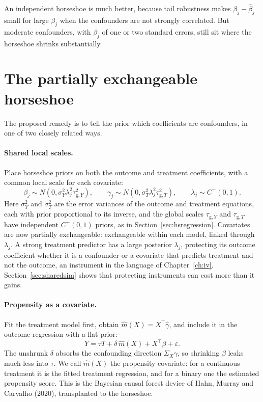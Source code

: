 An independent horseshoe is much better, because tail robustness makes $\beta_j - \hat\beta_j$ small for large $\beta_j$ when the confounders are not strongly correlated. But moderate confounders, with $\beta_j$ of one or two standard errors, still sit where the horseshoe shrinks substantially.

\section{The partially exchangeable horseshoe}

The proposed remedy is to tell the prior which coefficients are confounders, in one of two closely related ways.

\paragraph{Shared local scales.} Place horseshoe priors on both the outcome and treatment coefficients, with a common local scale for each covariate:
\begin{equation}
\beta_j \sim N(0, \sigma_Y^2\lambda_j^2\tau_{\mathrm{g},Y}^2), \qquad \gamma_j \sim N(0, \sigma_T^2\lambda_j^2\tau_{\mathrm{g},T}^2), \qquad \lambda_j \sim C^+(0,1).
\label{eq:shared}
\end{equation}
Here $\sigma_Y^2$ and $\sigma_T^2$ are the error variances of the outcome and treatment equations, each with prior proportional to its inverse, and the global scales $\tau_{\mathrm{g},Y}$ and $\tau_{\mathrm{g},T}$ have independent $C^+(0,1)$ priors, as in Section~\ref{sec:hsregression}. Covariates are now partially exchangeable: exchangeable within each model, linked through $\lambda_j$. A strong treatment predictor has a large posterior $\lambda_j$, protecting its outcome coefficient whether it is a confounder or a covariate that predicts treatment and not the outcome, an instrument in the language of Chapter~\ref{ch:iv}. Section~\ref{sec:sharedsim} shows that protecting instruments can cost more than it gains.

\paragraph{Propensity as a covariate.} Fit the treatment model first, obtain $\hat m(X) = X^\top\hat\gamma$, and include it in the outcome regression with a flat prior:
\[
Y = \tau T + \delta\,\hat m(X) + X^\top\beta + \varepsilon.
\]
The unshrunk $\delta$ absorbs the confounding direction $\Sigma_X\gamma$, so shrinking $\beta$ leaks much less into $\tau$. We call $\hat m(X)$ the propensity covariate: for a continuous treatment it is the fitted treatment regression, and for a binary one the estimated propensity score. This is the Bayesian causal forest device of Hahn, Murray and Carvalho (2020), transplanted to the horseshoe.

